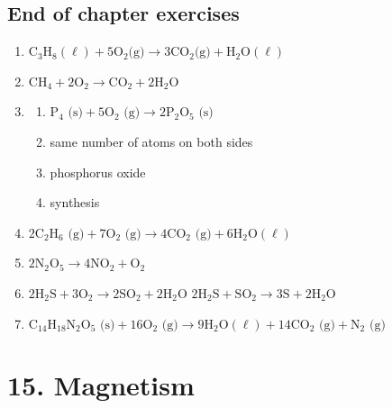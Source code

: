 \subsection{End of chapter exercises}
\begin{multicols}{2}
 \begin{enumerate}[noitemsep, label=\textbf{(\arabic*)} ]
\item ${\text{C}}_{3}{\text{H}}_{8} (\ell) + 5\text{O}_{2} \text{(g)} \to 3\text{CO}_{2} \text{(g)} + \text{H}_{2}\text{O} (\ell)$
\item $\text{CH}_{4} + 2\text{O}_{2} \to \text{CO}_{2} + 2\text{H}_{2}\text{O}$
\item 
 \begin{enumerate}[noitemsep, label=\textbf{(\alph*)} ]
\item $\text{P}_{4} \text{ (s)} + 5\text{O}_{2} \text{ (g)} \to 2\text{P}_{2}\text{O}_{5} \text{ (s)}$
\item same number of atoms on both sides
\item phosphorus oxide
\item synthesis
\end{enumerate}
\item $2\text{C}_{2}\text{H}_{6} \text{ (g)} + 7\text{O}_{2} \text{ (g)} \to 4\text{CO}_{2} \text{ (g)} + 6\text{H}_{2} \text{O} (\ell)$
\item $2\text{N}_{2}\text{O}_{5} \to 4\text{NO}_{2} + \text{O}_{2}$
\item $2\text{H}_{2}\text{S} + 3\text{O}_{2} \to 2\text{SO}_{2} + 2\text{H}_{2}\text{O}$ $2\text{H}_{2}\text{S} + \text{SO}_{2} \to 3\text{S} + 2\text{H}_{2}\text{O}$
\item $\text{C}_{14}\text{H}_{18}\text{N}_{2}\text{O}_{5} \text{ (s)} + 16\text{O}_{2} \text{ (g)} \to 9\text{H}_{2} \text{O} (\ell) + 14\text{CO}_{2} \text{ (g)} + \text{N}_{2} \text{ (g)}$
 \end{enumerate}
\end{multicols}

\section{15. Magnetism}
